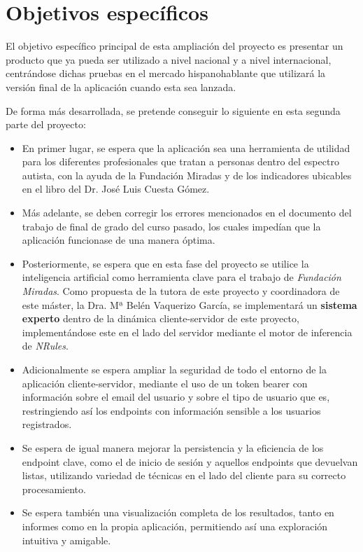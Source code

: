\section{Objetivos específicos}
El objetivo específico principal de esta ampliación del proyecto es presentar un
producto que ya pueda ser utilizado a nivel nacional y a nivel
internacional, centrándose dichas pruebas en el mercado hispanohablante que
utilizará la versión final de la aplicación cuando esta sea lanzada.

De forma más desarrollada, se pretende conseguir lo siguiente en esta segunda parte del proyecto:
\begin{itemize}
    \item En primer lugar, se espera que la aplicación sea una herramienta de
    utilidad para los diferentes profesionales que tratan a personas dentro del
    espectro autista, con la ayuda de la Fundación Miradas y de los indicadores
    ubicables en el libro del Dr. José Luis Cuesta Gómez.
    \item Más adelante, se deben corregir los errores mencionados en el
    documento del trabajo de final de grado del curso pasado, los cuales
    impedían que la aplicación funcionase de una manera óptima.
    \item Posteriormente, se espera que en esta fase del proyecto se utilice la
    inteligencia artificial como herramienta clave para el trabajo de
    \textit{Fundación Miradas}. Como propuesta de la tutora de este proyecto y
    coordinadora de este máster, la Dra. Mª Belén Vaquerizo García, se
    implementará un \textbf{sistema experto} dentro de la dinámica
    cliente-servidor de este proyecto, implementándose este en el lado del
    servidor mediante el motor de inferencia de \textit{NRules}.
    \item Adicionalmente se espera ampliar la seguridad de todo el entorno de la
    aplicación cliente-servidor, mediante el uso de un token bearer con información sobre el
    email del usuario y sobre el tipo de usuario que es, restringiendo así los
    endpoints con información sensible a los usuarios registrados.
    \item Se espera de igual manera mejorar la persistencia y la eficiencia de
    los endpoint clave, como el de inicio de sesión y aquellos endpoints que
    devuelvan listas, utilizando variedad de técnicas en el lado del cliente para su correcto procesamiento.
    \item Se espera también una visualización completa de los resultados, tanto
    en informes como en la propia aplicación, permitiendo así una exploración intuitiva y amigable.

\end{itemize}
